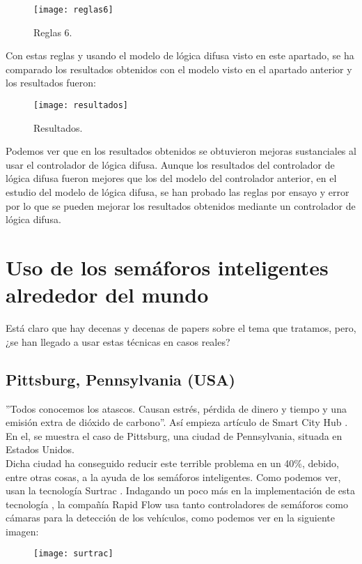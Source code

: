 \newpage



\begin{figure}[H]
	\texttt{[image: reglas6]}
	\centering
	\caption{Reglas 6.}

\end{figure}

Con estas reglas y usando el modelo de lógica difusa visto en este apartado, se ha comparado los resultados obtenidos con el modelo visto en el apartado anterior y los resultados fueron:\\

\begin{figure}[H]
	\texttt{[image: resultados]}
	\centering
	\caption{Resultados.}
\end{figure}


Podemos ver que en los resultados obtenidos se obtuvieron mejoras sustanciales al usar el controlador de lógica difusa. Aunque los resultados del controlador de lógica difusa fueron mejores que los del modelo del controlador anterior, en el estudio del modelo de lógica difusa, se han probado las reglas por ensayo y error por lo que se pueden mejorar los resultados obtenidos mediante un controlador de lógica difusa.\\

\newpage

\section{Uso de los semáforos inteligentes alrededor del mundo}

Está claro que hay decenas y decenas de papers sobre el tema que tratamos, pero, ¿se han llegado a usar estas técnicas en casos reales?

\subsection{Pittsburg, Pennsylvania (USA)}
''Todos conocemos los atascos. Causan estrés, pérdida de dinero y tiempo y una emisión extra de dióxido de carbono''. Así empieza artículo de Smart City Hub \cite{smart}. En el, se muestra el caso de Pittsburg, una ciudad de Pennsylvania, situada en Estados Unidos.\\

 Dicha ciudad ha conseguido reducir este terrible problema en un 40\%, debido, entre otras cosas, a la ayuda de los semáforos inteligentes. Como podemos ver, usan la tecnología Surtrac \cite{surtrac}. Indagando un poco más en la implementación de esta tecnología \cite{implementacion}, la compañía Rapid Flow usa tanto controladores de semáforos como cámaras para la detección de los vehículos, como podemos ver en la siguiente imagen:
\begin{figure}[H]
	\centering
	\texttt{[image: surtrac]}
	\label{fig:surtrac}
\end{figure}

